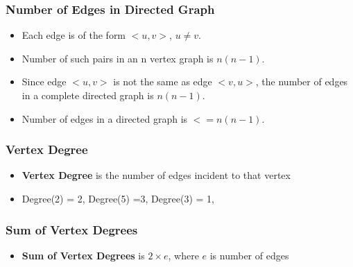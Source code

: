 \documentclass[newPxFont,sthlmFooter,nooffset]{beamer}
\begin{document}
\begin{frame}[t]
  \frametitle{Number of Edges in Directed Graph}
  \begin{itemize}
  \item Each edge is of the form $<u,v>$, $u \neq v$.
  \item Number of such pairs in an n vertex graph is $n(n-1)$.
  \item Since edge $<u,v>$ is not the same as edge $<v,u>$, the
number of edges in a complete directed graph is $n(n-1)$.
\item Number of edges in a directed graph is $<= n(n-1)$.
  \end{itemize}
\end{frame}


\begin{frame}[t]
  \frametitle{Vertex Degree}
  \begin{itemize}
  \item \textbf{Vertex Degree} is the number of edges incident to that vertex
  \item Degree(2) = 2, Degree(5) =3, Degree(3) = 1, 
  \end{itemize}
  \begin{center}
  \end{center}

\end{frame}

\begin{frame}[t]
  \frametitle{Sum of Vertex Degrees}
  \begin{itemize}
  \item \textbf{Sum of Vertex Degrees} is $2\times e$, where $e$ is number of edges
  \end{itemize}
  \begin{center}
  \end{center}

\end{frame}
\end{document}
